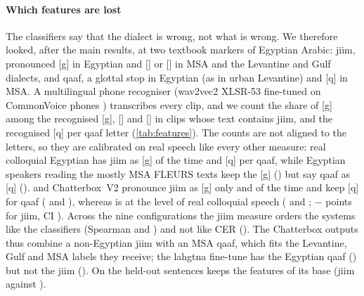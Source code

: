 \begin{table}[t]
\centering\small
\caption{Blind listening test ( native Egyptian listeners after quality control). Mean ratings with
listener-and-sentence bootstrap 95\% intervals; ``wrong word heard'': share of clips for which the listener reported a
wrong, missing or garbled word; ``same speaker'': similarity to a second real clip of the cloned speaker (four pairs
per listener, one per system, so its intervals are wide). Systems and real speech were presented in a
random order with hidden names.}
\label{tab:listening}

\end{table}

\paragraph{Which features are lost}
The classifiers say that the dialect is wrong, not what is wrong. We therefore looked, after the main results, at two
textbook markers of Egyptian Arabic: jiim, pronounced [g] in Egyptian and [] or [] in MSA and the Levantine and Gulf
dialects, and qaaf, a glottal stop in Egyptian (as in urban Levantine) and [q] in MSA. A multilingual phone recogniser
(wav2vec2 XLSR-53 fine-tuned on CommonVoice phones \citep{xu2022phoneme}) transcribes every clip, and we count the
share of [g] among the recognised [g], [] and [] in clips whose text contains jiim, and the recognised [q] per qaaf
letter (\cref{tab:features}). The counts are not aligned to the letters, so they are calibrated on real speech like every
other measure: real colloquial Egyptian has jiim as [g]  of the time and  [q]
per qaaf, while Egyptian speakers reading the mostly MSA FLEURS texts keep the [g] () but say
qaaf as [q] (). \cbthree and Chatterbox~V2 pronounce jiim as [g] only  and
 of the time and keep [q] for qaaf ( and ), whereas \vox is at the
level of real colloquial speech ( and ; \vox $-$ \cbthree
{} points for jiim, CI ). Across the nine configurations the jiim
measure orders the systems like the classifiers (Spearman  and ) and not like CER
(). The Chatterbox outputs thus combine a non-Egyptian jiim with an MSA qaaf, which fits the Levantine,
Gulf and MSA labels they receive; the lahgtna fine-tune has the Egyptian qaaf () but not the jiim
(). On the held-out sentences \BA keeps the features of its base (jiim  against
).

